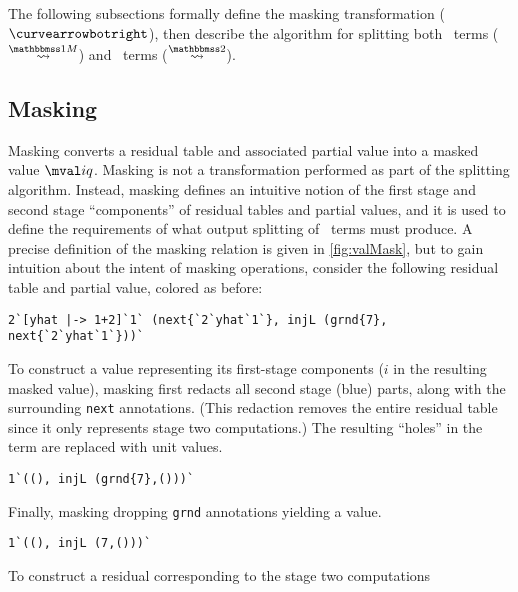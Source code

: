 \begin{abstrsyn}
The following subsections formally define the masking transformation
($\vsplito$), then describe the algorithm for splitting both
\bbonem\ terms ($\splitonesym$) and \bbtwo\ terms ($\splittwosym$).
  
\subsection{Masking}
\label{sec:masking}

Masking converts a residual table and associated partial value into a
masked value $\mval i q$.
Masking is not a transformation performed as part of the splitting
algorithm.  Instead, masking defines an intuitive notion of the first
stage and second stage ``components'' of residual tables and partial
values, and it is used to define the requirements of what output
splitting of \bbonem\ terms must produce.  A precise definition of the
masking relation is given in \ref{fig:valMask}, but to gain intuition
about the intent of masking operations, consider the following
residual table and partial value, colored as before:
\begin{lstlisting}
2`[yhat |-> 1+2]`1` (next{`2`yhat`1`}, injL (grnd{7}, next{`2`yhat`1`}))`
\end{lstlisting}
To construct a value representing its first-stage components ($i$ in
the resulting masked value), masking first redacts all second stage
(blue) parts, along with the surrounding \texttt{next}
annotations. (This redaction removes the entire residual table since
it only represents stage two computations.) The resulting ``holes'' in
the term are replaced with unit values.
\begin{lstlisting}
1`((), injL (grnd{7},()))`
\end{lstlisting}
Finally, masking dropping \texttt{grnd} annotations yielding a value.
\begin{lstlisting}
1`((), injL (7,()))`
\end{lstlisting}
To construct a residual corresponding to the stage two computations

\end{abstrsyn}

